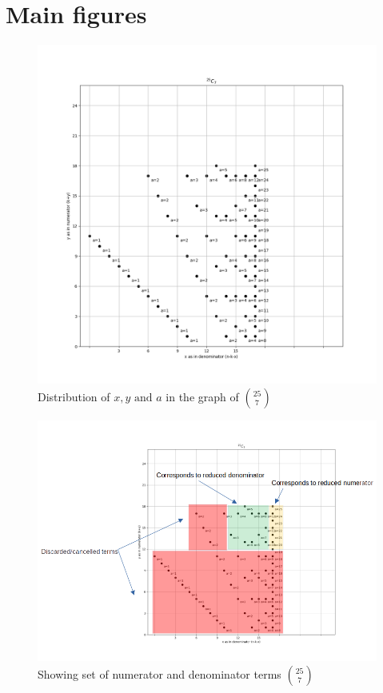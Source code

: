 \documentclass[10pt, twoside]{article}
\newcommand*{\Combination}[2]{\binom{#1}{#2}}%
\begin{document}
\section{Main figures}
\begin{figure}[ph!]
	\includegraphics[width=\linewidth]{25_7_alone.png}
	\caption{Distribution of $x,y \text{ and } a$ in the graph of $\Combination{25}{7}$}
	\label{25_C_7_example}
\end{figure}
\begin{figure}[ph!]
	\includegraphics[width=\linewidth]{CalculationOfCombination.png}
	\caption{Showing set of numerator and denominator terms $\Combination{25}{7}$}
	\label{CalculationOfCombination}
\end{figure}
\end{document}
